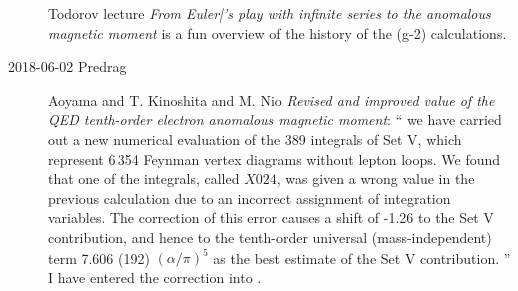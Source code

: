 \begin{description}
Todorov lecture {\em From {Euler|}'s play with infinite series to
the anomalous magnetic moment} is a fun overview of the history of the (g-2)
calculations.

\item[2018-06-02 Predrag]
Aoyama and T. Kinoshita and M. Nio {\em Revised and improved value
of the {QED} tenth-order electron anomalous magnetic moment}:
``
we have carried out a new numerical evaluation of the 389 integrals of Set V,
which represent 6\,354 Feynman vertex diagrams without lepton loops. We found
that one of the integrals, called $X024$, was given a wrong value in the
previous calculation due to an incorrect assignment of integration variables.
The correction of this error causes a shift of -1.26 to the Set V contribution,
and hence to the tenth-order universal (mass-independent) term 7.606
(192) $(\alpha/{\pi})^5$ as the best estimate of the Set V contribution.
''
I have entered the correction into .



\end{description}

